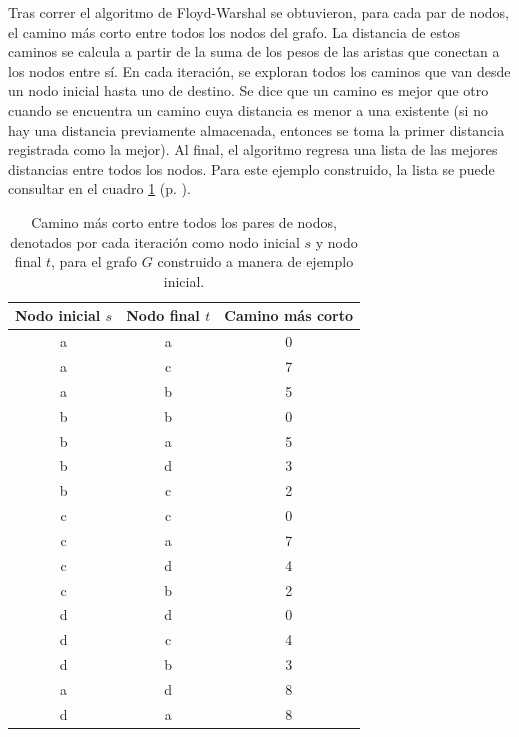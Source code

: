 \documentclass{article}
\begin{document}
  Tras correr el algoritmo de Floyd-Warshal se obtuvieron, para cada par de nodos, el camino más corto entre todos los nodos del grafo. La distancia de estos caminos se calcula a partir de la suma de los pesos de las aristas que conectan a los nodos entre sí. En cada iteración, se exploran todos los caminos que van desde un nodo inicial hasta uno de destino. Se dice que un camino es mejor que otro cuando se encuentra un camino cuya distancia es menor a una existente (si no hay una distancia previamente almacenada, entonces se toma la primer distancia registrada como la mejor). Al final, el algoritmo regresa una lista de las mejores distancias entre todos los nodos. Para este ejemplo construido, la lista se puede consultar en el cuadro \ref{cuadro:floyd-ejemplo} (p. \pageref{cuadro:floyd-ejemplo}).

  \begin{table}[]
  \centering
  \caption{Camino más corto entre todos los pares de nodos, denotados por cada iteración como nodo inicial $s$ y nodo final $t$, para el grafo $G$ construido a manera de ejemplo inicial.}
  \label{cuadro:floyd-ejemplo}
  \begin{tabular}{@{}ccc@{}}
  \toprule
  \textbf{Nodo inicial $s$} & \textbf{Nodo final $t$} & \textbf{Camino más corto} \\ \midrule
  a & a & 0 \\ \midrule
  a & c & 7 \\ \midrule
  a & b & 5 \\ \midrule
  b & b & 0 \\ \midrule
  b & a & 5 \\ \midrule
  b & d & 3 \\ \midrule
  b & c & 2 \\ \midrule
  c & c & 0 \\ \midrule
  c & a & 7 \\ \midrule
  c & d & 4 \\ \midrule
  c & b & 2 \\ \midrule
  d & d & 0 \\ \midrule
  d & c & 4 \\ \midrule
  d & b & 3 \\ \midrule
  a & d & 8 \\ \midrule
  d & a & 8 \\ \bottomrule
  \end{tabular}
  \end{table}

  

\end{document}
